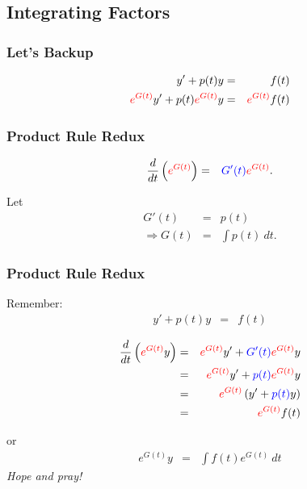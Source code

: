 \subsection{Integrating Factors}

\begin{frame}
  \frametitle{Let's Backup}

  \begin{eqnarray*}
    y' + p(t) y & = & f(t) \\
    {\color{red}e^{G(t)}} y' + p(t) {\color{red}e^{G(t)}} y & = & {\color{red}e^{G(t)}} f(t)
  \end{eqnarray*}


\end{frame}



\begin{frame}
  \frametitle{Product Rule Redux}

  \begin{eqnarray*}
    \frac{d}{dt} \left( {\color{red}e^{G(t)}} \right) & = & {\color{blue}G'(t)} {\color{red}e^{G(t)}}.
  \end{eqnarray*}

  Let
  \begin{eqnarray*}
    G'(t) & = & p(t) \\
    \Rightarrow G(t) & = & \int p(t) ~ dt.
  \end{eqnarray*}


\end{frame}


\begin{frame}
  \frametitle{Product Rule Redux}

  Remember:
  \begin{eqnarray*}
    y' + p(t) y & = & f(t)
  \end{eqnarray*}


  \begin{eqnarray*}
    \frac{d}{dt} \left( {\color{red}e^{G(t)}} y \right) & = & {\color{red}e^{G(t)}} y' + {\color{blue}G'(t)} {\color{red}e^{G(t)}} y \\
    & = & {\color{red}e^{G(t)}} y' + {\color{blue}p(t)} {\color{red}e^{G(t)}} y \\
    & = & {\color{red}e^{G(t)}} \left( y' + {\color{blue}p(t)} y \right) \\
    & = &  {\color{red}e^{G(t)}} f(t)
  \end{eqnarray*}

  or
  \begin{eqnarray*}
    e^{G(t)} y & = & \int f(t) e^{G(t)} ~ dt
  \end{eqnarray*}
  \textit{Hope and pray!}

\end{frame}


